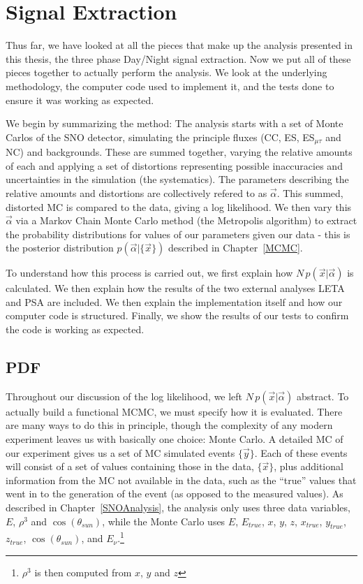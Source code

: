 
\chapter{Signal Extraction}
\label{SigEx}

Thus far, we have looked at all the pieces that make up the analysis
presented in this thesis, the three phase Day/Night signal extraction.
Now we put all of these pieces together to actually perform the
analysis.  We look at the underlying methodology, the computer code
used to implement it, and the tests done to ensure it was working as
expected.

We begin by summarizing the method: The analysis starts with a set of
Monte Carlos of the SNO detector, simulating the principle fluxes (CC,
ES, ES$_{\mu\tau}$ and NC) and backgrounds.  These are summed
together, varying the relative amounts of each and applying a set of
distortions representing possible inaccuracies and uncertainties in
the simulation (the systematics).  The parameters describing the
relative amounts and distortions are collectively refered to as
$\vec{\alpha}$.  This summed, distorted MC is compared to the data,
giving a log likelihood.  We then vary this $\vec{\alpha}$ via a
Markov Chain Monte Carlo method (the Metropolis algorithm) to extract
the probability distributions for values of our parameters given our
data - this is the posterior distribution
$p(\vec{\alpha}|\{\vec{x}\})$ described in \mbox{Chapter \ref{MCMC}}.

To understand how this process is carried out, we first explain how
$N\,p(\vec{x}|\vec{\alpha})$ is calculated.  We then explain how the
results of the two external analyses LETA and PSA are included.  We
then explain the implementation itself and how our computer code is
structured.  Finally, we show the results of our tests to confirm the
code is working as expected.


\section{PDF}
\label{PDFGeneration}
Throughout our discussion of the log likelihood, we left $N \,
p(\vec{x}|\vec{\alpha})$ abstract.  To actually build a functional
MCMC, we must specify how it is evaluated.  There are many ways to do
this in principle, though the complexity of any modern experiment
leaves us with basically one choice: Monte Carlo.  A detailed MC of
our experiment gives us a set of MC simulated events $\{\vec{y}\}$.
Each of these events will consist of a set of values containing those
in the data, $\{\vec{x}\}$, plus additional information from the MC
not available in the data, such as the ``true'' values that went in to
the generation of the event (as opposed to the measured values).  As
described in \mbox{Chapter \ref{SNOAnalysis}}, the analysis only
uses three data variables, $E$, $\rho^3$ and $\cos(\theta_{sun})$,
while the Monte Carlo uses $E$, $E_{true}$, $x$, $y$, $z$, $x_{true}$,
$y_{true}$, $z_{true}$, $\cos(\theta_{sun})$, and
$E_{\nu}$.\footnote{$\rho^3$ is then computed from $x$, $y$ and $z$}

